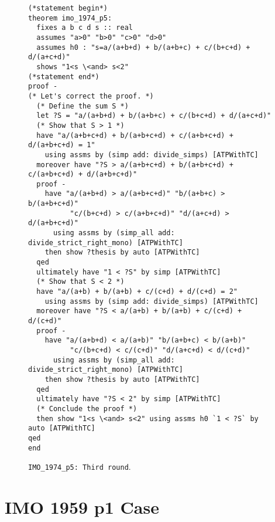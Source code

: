 \documentclass{article} \usepackage{iclr2024_conference,times}
\begin{document}
\begin{figure}[H]
\begin{tcolorbox}[colback=mybrown!5!white,colframe=mybrown!75!black]
\begin{small}
\begin{lstlisting}[style=isabelle]
(*statement begin*)
theorem imo_1974_p5:
  fixes a b c d s :: real
  assumes "a>0" "b>0" "c>0" "d>0"
  assumes h0 : "s=a/(a+b+d) + b/(a+b+c) + c/(b+c+d) + d/(a+c+d)"
  shows "1<s \<and> s<2"
(*statement end*)
proof -
(* Let's correct the proof. *)
  (* Define the sum S *)
  let ?S = "a/(a+b+d) + b/(a+b+c) + c/(b+c+d) + d/(a+c+d)"
  (* Show that S > 1 *)
  have "a/(a+b+c+d) + b/(a+b+c+d) + c/(a+b+c+d) + d/(a+b+c+d) = 1" 
    using assms by (simp add: divide_simps) [ATPWithTC]
  moreover have "?S > a/(a+b+c+d) + b/(a+b+c+d) + c/(a+b+c+d) + d/(a+b+c+d)" 
  proof -
    have "a/(a+b+d) > a/(a+b+c+d)" "b/(a+b+c) > b/(a+b+c+d)" 
          "c/(b+c+d) > c/(a+b+c+d)" "d/(a+c+d) > d/(a+b+c+d)"
      using assms by (simp_all add: divide_strict_right_mono) [ATPWithTC]
    then show ?thesis by auto [ATPWithTC]
  qed
  ultimately have "1 < ?S" by simp [ATPWithTC]
  (* Show that S < 2 *)
  have "a/(a+b) + b/(a+b) + c/(c+d) + d/(c+d) = 2" 
    using assms by (simp add: divide_simps) [ATPWithTC]
  moreover have "?S < a/(a+b) + b/(a+b) + c/(c+d) + d/(c+d)"
  proof -
    have "a/(a+b+d) < a/(a+b)" "b/(a+b+c) < b/(a+b)" 
          "c/(b+c+d) < c/(c+d)" "d/(a+c+d) < d/(c+d)"
      using assms by (simp_all add: divide_strict_right_mono) [ATPWithTC]
    then show ?thesis by auto [ATPWithTC]
  qed
  ultimately have "?S < 2" by simp [ATPWithTC]
  (* Conclude the proof *)
  then show "1<s \<and> s<2" using assms h0 `1 < ?S` by auto [ATPWithTC]
qed
end

\end{lstlisting}
\end{small}
\end{tcolorbox}
\caption{
\small
\texttt{IMO\_1974\_p5: Third round}.
}
\label{fig:case_study imo 1973 p5 3}
\end{figure}







\newpage
\section{IMO 1959 p1 Case}
\end{document}

